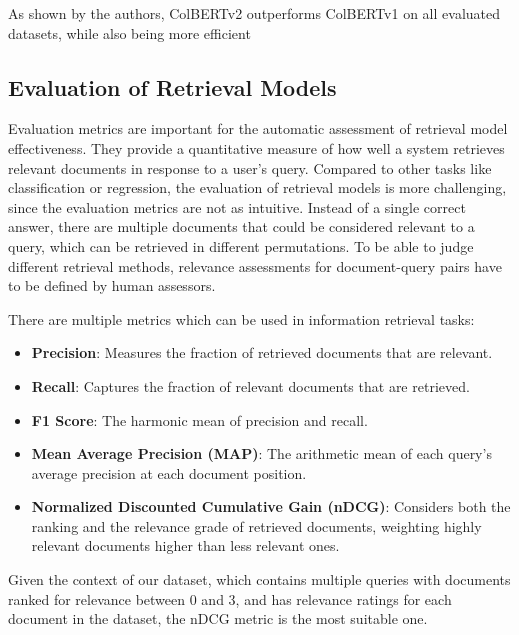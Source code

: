 As shown by the authors, ColBERTv2 outperforms ColBERTv1 on all evaluated datasets, while also being more efficient

\subsection{Evaluation of Retrieval Models}\label{sec:evaluation-of-retrieval-models}
Evaluation metrics are important for the automatic assessment of retrieval model effectiveness.
They provide a quantitative measure of how well a system retrieves relevant documents in response to a user's query.
Compared to other tasks like classification or regression, the evaluation of retrieval models is more challenging, since the evaluation metrics are not as intuitive.
Instead of a single correct answer, there are multiple documents that could be considered relevant to a query, which can be retrieved in different permutations.
To be able to judge different retrieval methods, relevance assessments for document-query pairs have to be defined by human assessors.

There are multiple metrics which can be used in information retrieval tasks:
\begin{itemize}
    \item \textbf{Precision}: Measures the fraction of retrieved documents that are relevant.
    \item \textbf{Recall}: Captures the fraction of relevant documents that are retrieved.
    \item \textbf{F1 Score}: The harmonic mean of precision and recall.
    \item \textbf{Mean Average Precision (MAP)}: The arithmetic mean of each query's average precision at each document position.
    \item \textbf{Normalized Discounted Cumulative Gain (nDCG)}: Considers both the ranking and the relevance grade of retrieved documents, weighting highly relevant documents higher than less relevant ones.
\end{itemize}
Given the context of our dataset, which contains multiple queries with documents ranked for relevance between 0 and 3, and has relevance ratings for each document in the dataset, the nDCG metric is the most suitable one.

